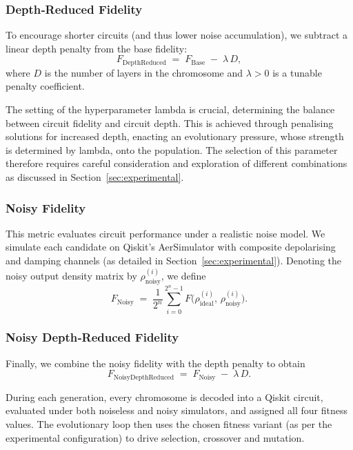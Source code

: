 \documentclass[11pt,a4paper]{article}
\begin{document}
\subsubsection*{Depth‐Reduced Fidelity}
To encourage shorter circuits (and thus lower noise accumulation), we subtract a linear depth penalty from the base fidelity:
\begin{equation}
  F_{\mathrm{DepthReduced}}
  \;=\;F_{\mathrm{Base}}\;-\;\lambda\,D,
\end{equation}
where $D$ is the number of layers in the chromosome and $\lambda>0$ is a tunable penalty coefficient.\newline

The setting of the hyperparameter lambda is crucial, determining the balance between circuit fidelity and circuit depth. This is achieved through penalising solutions for increased depth, enacting an evolutionary pressure, whose strength is determined by lambda, onto the population. The selection of this parameter therefore requires careful consideration and exploration of different combinations as discussed in Section~\ref{sec:experimental}.

\subsubsection*{Noisy Fidelity}
This metric evaluates circuit performance under a realistic noise model.  We simulate each candidate on Qiskit’s AerSimulator with composite depolarising and damping channels (as detailed in Section~\ref{sec:experimental}).  Denoting the noisy output density matrix by $\rho_{\mathrm{noisy}}^{(i)}$, we define
\begin{equation}
  F_{\mathrm{Noisy}}
  \;=\;\frac{1}{2^n}\sum_{i=0}^{2^n-1}
    F\bigl(\rho_{\mathrm{ideal}}^{(i)},\,\rho_{\mathrm{noisy}}^{(i)}\bigr).
\end{equation}

\subsubsection*{Noisy Depth‐Reduced Fidelity}

Finally, we combine the noisy fidelity with the depth penalty to obtain
\begin{equation}
  F_{\mathrm{NoisyDepthReduced}}
  \;=\;F_{\mathrm{Noisy}}\;-\;\lambda\,D.
\end{equation}

During each generation, every chromosome is decoded into a Qiskit circuit, evaluated under both noiseless and noisy simulators, and assigned all four fitness values.  The evolutionary loop then uses the chosen fitness variant (as per the experimental configuration) to drive selection, crossover and mutation.
\end{document}
